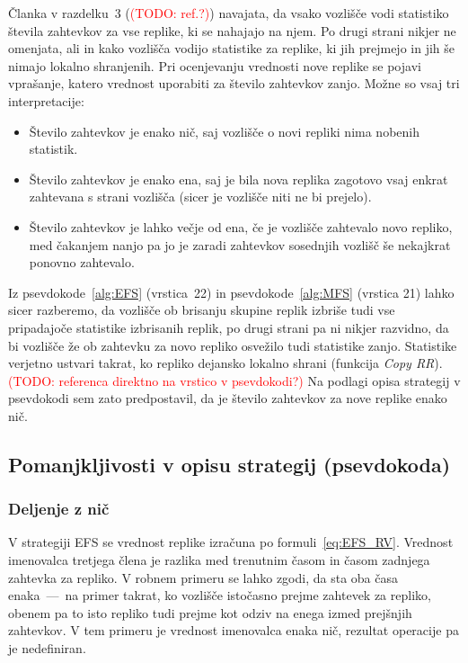 \documentclass[a4paper, 12pt]{book}
\newcommand{\TODO}[1]{\textcolor{red}{(TODO: #1)}}
\begin{document}
Članka v razdelku~3 (\TODO{ref.?}) navajata, da vsako vozlišče vodi statistiko
števila zahtevkov za vse replike, ki se nahajajo na njem. Po drugi strani
nikjer ne omenjata, ali in kako vozlišča vodijo statistike za replike, ki jih
prejmejo in jih še nimajo lokalno shranjenih.
Pri ocenjevanju vrednosti nove replike se pojavi vprašanje, katero vrednost
uporabiti za število zahtevkov zanjo. Možne so vsaj tri interpretacije:

\begin{itemize}
\item Število zahtevkov je enako nič, saj vozlišče o novi repliki nima nobenih
statistik.
\item Število zahtevkov je enako ena, saj je bila nova replika zagotovo vsaj
enkrat zahtevana s strani vozlišča (sicer je vozlišče niti ne bi prejelo).
\item Število zahtevkov je lahko večje od ena, če je vozlišče zahtevalo novo
repliko, med čakanjem nanjo pa jo je zaradi zahtevkov sosednjih vozlišč
še nekajkrat ponovno zahtevalo.
\end{itemize}

Iz psevdokode~\ref{alg:EFS} (vrstica~22) in psevdokode~\ref{alg:MFS} (vrstica 21)
lahko sicer razberemo, da vozlišče ob brisanju skupine replik izbriše tudi vse
pripadajoče statistike izbrisanih replik, po drugi strani pa ni nikjer razvidno,
da bi vozlišče že ob zahtevku za novo repliko osvežilo tudi statistike zanjo.
Statistike verjetno ustvari takrat, ko repliko dejansko lokalno shrani
(funkcija \textit{Copy RR}). \TODO{referenca direktno na vrstico v psevdokodi?}
Na podlagi opisa strategij v psevdokodi sem zato predpostavil, da je število
zahtevkov za nove replike enako nič.


\subsection{Pomanjkljivosti v opisu strategij (psevdokoda)}

\subsubsection{Deljenje z nič}

V strategiji EFS se vrednost replike izračuna po formuli~\eqref{eq:EFS_RV}.
Vrednost imenovalca tretjega člena je razlika med trenutnim časom in časom
zadnjega zahtevka za repliko. V robnem primeru se lahko zgodi, da sta oba časa
enaka~---~na primer takrat, ko vozlišče istočasno prejme zahtevek za repliko,
obenem pa to isto repliko tudi prejme kot odziv na enega izmed prejšnjih
zahtevkov. V tem primeru je vrednost imenovalca enaka nič, rezultat operacije
pa je nedefiniran.
\end{document}

